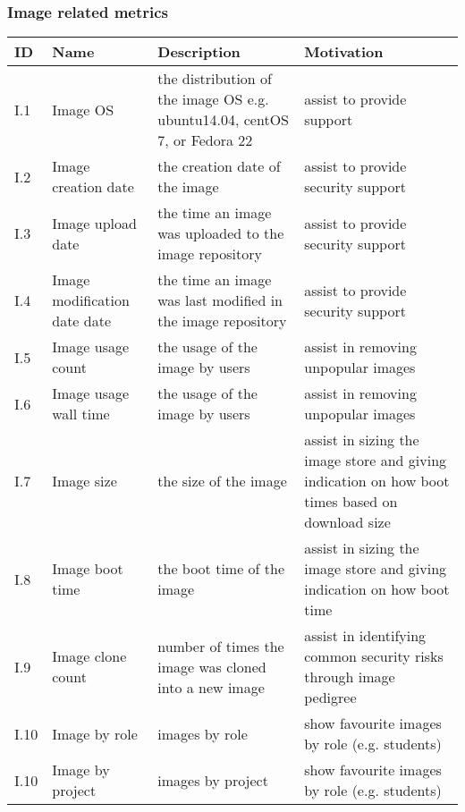 \documentclass{beamer}
\newcommand{\eTABLE}{\end{tabular}
\end{center}
\end{scriptsize}
}
\newcommand{\bTABLE}[2]{
\frametitle{#1}
\bigskip
\begin{scriptsize}
\begin{center}
\begin{tabular}{lp{0.15\textwidth}p{0.3\textwidth}p{0.4\textwidth}}
\hline
\rowcolor{blue!20} \bf ID & \bf Name & \bf Description & \bf Motivation \\
\hline}
\newenvironment{METRICTABLE}[2] {\bTABLE{#1}{#2}}{\eTABLE}
\begin{document}
\begin{frame}[shrink]
\begin{METRICTABLE}{Image related metrics}{T:image}
I.1  & Image OS & the distribution of the image OS  e.g. ubuntu14.04, centOS 7, or Fedora 22 & assist to provide support \\ \hline
I.2  & Image creation date & the creation date of the image  & assist to provide security support \\ \hline
I.3  & Image upload date & the time an image was uploaded to the image repository & assist to provide security support \\ \hline
I.4  & Image modification date date & the time an image was last modified in the  image repository & assist to provide security support \\ \hline
I.5  & Image usage count & the usage of the image by users  & assist in removing unpopular images \\ \hline
I.6  & Image usage wall time & the usage of the image by users  & assist in removing unpopular images \\ \hline
I.7  & Image size & the size of the image  & assist in sizing the image store and giving indication on how boot times based on download size \\ \hline
I.8  & Image boot time & the boot time of the image  & assist in sizing the image store and giving indication on how boot time \\ \hline
I.9  & Image clone count & number of times the image was cloned into a new image  & assist in identifying common security risks through image pedigree \\ \hline
I.10 & Image by role & images by role  & show favourite images by role (e.g. students) \\ \hline
I.10 & Image by project & images by project  & show favourite images by role (e.g. students) \\ \hline
\end{METRICTABLE}
\end{frame}
\end{document}
